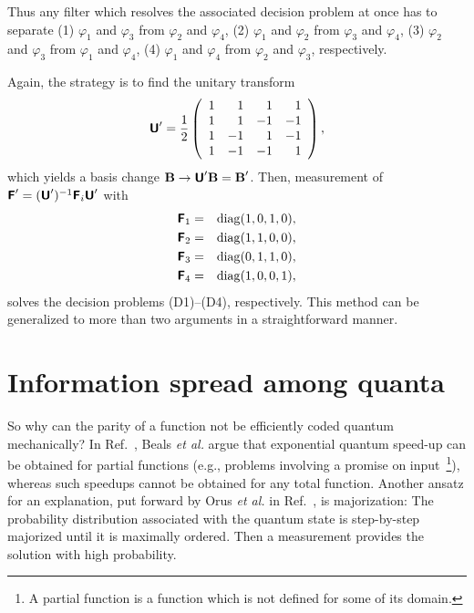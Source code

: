Thus any filter which resolves the associated decision problem at once has to
separate
(1)
$\varphi_1$ and $\varphi_3$ from $\varphi_2$ and $\varphi_4$,
(2)
$\varphi_1$ and $\varphi_2$ from $\varphi_3$ and $\varphi_4$,
(3)
$\varphi_2$ and $\varphi_3$ from $\varphi_1$ and $\varphi_4$,
(4)
$\varphi_1$ and $\varphi_4$ from $\varphi_2$ and $\varphi_3$, respectively.



Again, the strategy is to find the unitary transform
\begin{equation}
\textsf{\textbf{U}}'=\frac{1}{2}
\left(
\begin{array}{rrrr}
 1&  1& 1&  1\\
 1& 1& -1& -1\\
1&  -1& 1& -1\\
1& -1& -1&  1
\end{array}
\right) ,
\end{equation}
which yields a basis change
$\textbf{B} \rightarrow \textsf{\textbf{U}}'\textbf{B}=\textbf{B}'$.
Then, measurement of
$\textsf{\textbf{F}}' =
(\textsf{\textbf{U}}')^{-1}\textsf{\textbf{F}}_i\textsf{\textbf{U}}'$
with
\begin{eqnarray}
\textsf{\textbf{F}}_1&=&{\rm diag}(1,0,1,0), \\
\textsf{\textbf{F}}_2&=&{\rm diag}(1,1,0,0),   \\
\textsf{\textbf{F}}_3&=&{\rm diag}(0,1,1,0),   \\
\textsf{\textbf{F}}_4&=&{\rm diag}(1,0,0,1),
\end{eqnarray}
solves the decision problems (D1)--(D4), respectively.
This method can be generalized to more than two arguments in a straightforward manner.




\section{Information spread among quanta}

So why can the parity of a function not be efficiently coded quantum mechanically?
In Ref.~\cite{bbcmw-01}, Beals {\it et al.}
argue that exponential quantum speed-up can be obtained for
partial functions (e.g., problems involving a promise on input~\footnote{
A partial function is a function which is not defined for some of its domain.}),
whereas such speedups cannot be obtained
for any total function.
Another ansatz for an explanation,
put forward by Orus {\it et al.}
in Ref.~\cite{orus-04}, is majorization:
The
probability distribution associated with the quantum state is step-by-step majorized until
it is maximally ordered.
Then a measurement provides the solution with high probability.

